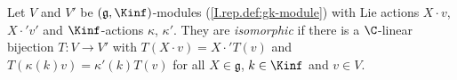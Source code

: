 Let $V$ and $V'$ be $(\mathfrak g,\Kinf)$-modules (\cref{I.rep.def:gk-module}) with Lie actions $X\cdot v$, $X\cdot'v'$
and $\Kinf$-actions $\kappa$, $\kappa'$. They are \emph{isomorphic} if there is a $\C$-linear bijection $T\colon V\to V'$
with $T(X\cdot v)=X\cdot'T(v)$ and $T(\kappa(k)v)=\kappa'(k)T(v)$ for all $X\in\mathfrak g$, $k\in\Kinf$ and $v\in V$.
